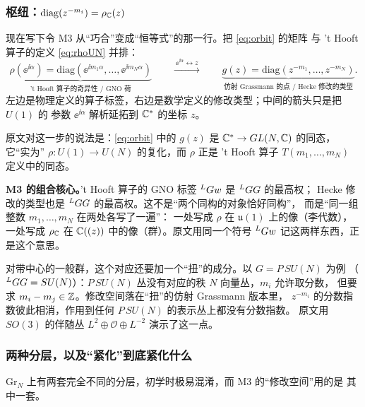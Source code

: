 \subsubsection{枢纽：$\mathrm{diag}(z^{-m_i})=\rho_{\mathbb{C}}(z)$}

现在写下令 M3 从“巧合”变成“恒等式”的那一行。把 \eqref{eq:orbit} 的矩阵
与 't Hooft{} 算子的定义 \eqref{eq:rhoUN} 并排：
\begin{equation}
\underbrace{\rho(\ee^{\ii\alpha})=\mathrm{diag}(\ee^{\ii m_1\alpha},\dots,\ee^{\ii m_N\alpha})}
_{\text{'t Hooft 算子的奇异性 / GNO 荷}}
\qquad\xrightarrow{\ \ee^{\ii\alpha}\leftrightarrow z\ } \qquad
\underbrace{g(z)=\mathrm{diag}(z^{-m_1},\dots,z^{-m_N})}
_{\text{仿射 Grassmann 的点 / Hecke 修改的类型}}.
\label{eq:rhoC}
\end{equation}
左边是物理定义的算子标签，右边是数学定义的修改类型；中间的箭头只是把 $U(1)$ 的
参数 $\ee^{\ii\alpha}$ 解析延拓到 $\mathbb{C}^*$ 的坐标 $z$。\pA{}

原文对这一步的说法是：\eqref{eq:orbit} 中的 $g(z)$ 是 $\mathbb{C}^*\to GL(N,\mathbb{C})$ 的同态，
它“实为” $\rho:U(1)\to U(N)$ 的复化，而 $\rho$ 正是 't Hooft{} 算子
$T(m_1,\dots,m_N)$ 定义中的同态。\pA{}

\begin{keyidea}
\textbf{M3 的组合核心。}'t Hooft{} 算子的 GNO 标签 ${}^{L}G w$ 是 ${}^{L}G G$ 的最高权；
Hecke 修改的类型也是 ${}^{L}G G$ 的最高权。这不是“两个同构的对象恰好同构”，
而是“同一组整数 $m_1,\dots,m_N$ 在两处各写了一遍”：
一处写成 $\rho$ 在 $\mathfrak{u}(1)$ 上的像（李代数），一处写成 $\rho_{\mathbb{C}}$ 在
$\mathbb{C}((z))$ 中的像（群）。原文用同一个符号 ${}^{L}G w$ 记这两样东西，正是这个意思。\pA{}
\end{keyidea}

对带中心的一般群，这个对应还要加一个“扭”的成分。以 $G=P\,SU(N)$ 为例
（${}^{L}G G=SU(N)$）：$P\,SU(N)$ 丛没有对应的秩 $N$ 向量丛，$m_i$ 允许取分数，
但要求 $m_i-m_j\in\mathbb{Z}$。修改空间落在“扭”的仿射 Grassmann 版本里，
$z^{-m_i}$ 的分数指数彼此相消，作用到任何 $P\,SU(N)$ 的表示丛上都没有分数指数。
原文用 $SO(3)$ 的伴随丛 $L^2\oplus\mathcal{O}\oplus L^{-2}$ 演示了这一点。\pA{}

\subsubsection{两种分层，以及“紧化”到底紧化什么}

$\mathrm{Gr}_N$ 上有两套完全不同的分层，初学时极易混淆，而 M3 的“修改空间”用的是
其中一套。

